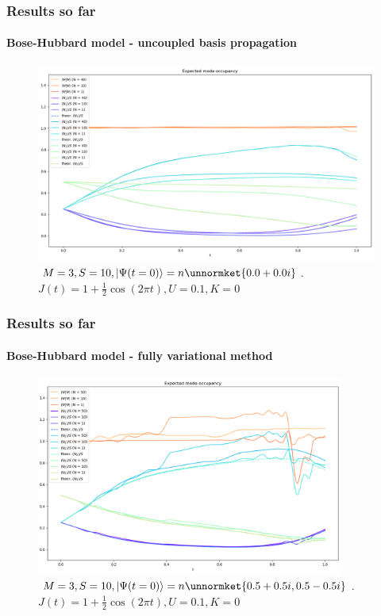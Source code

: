 \documentclass[english]{beamer}
\begin{document}
  \begin{frame}
  	\frametitle{Results so far}
  	\framesubtitle{Bose-Hubbard model - uncoupled basis propagation}
  	\begin{figure}
	\centering
    		\includegraphics[width=1.0\textwidth]{images/BH_M=3_uncoupled_basis}
    		\caption{$M=3, S=10, \ket{\Psi(t=0)}=n\unnormket{0.0+0.0i}$. $J(t)=1+\frac{1}{2}\cos(2\pi t), U=0.1, K=0$}
    		\label{fig:BH2}
	\end{figure}
  \end{frame}
  
  \begin{frame}
  	\frametitle{Results so far}
  	\framesubtitle{Bose-Hubbard model - fully variational method}
  	\begin{figure}
	\centering
    		\includegraphics[width=0.9\textwidth]{images/BH_M=3}
    		\caption{$M=3, S=10, \ket{\Psi(t=0)}=n\unnormket{0.5+0.5i,0.5-0.5i}$. $J(t)=1+\frac{1}{2}\cos(2\pi t), U=0.1, K=0$}
    		\label{fig:BH3}
	\end{figure}
  \end{frame}
  
\end{document}
